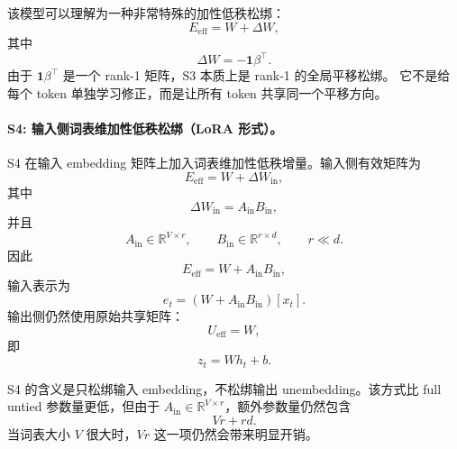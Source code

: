 该模型可以理解为一种非常特殊的加性低秩松绑：
\begin{equation}
    E_{\mathrm{eff}} = W + \Delta W,
\end{equation}
其中
\begin{equation}
    \Delta W = -\mathbf{1}\beta^\top.
\end{equation}
由于 $\mathbf{1}\beta^\top$ 是一个 rank-1 矩阵，S3 本质上是 rank-1 的全局平移松绑。
它不是给每个 token 单独学习修正，而是让所有 token 共享同一个平移方向。

\paragraph{S4: 输入侧词表维加性低秩松绑（LoRA 形式）。}
S4 在输入 embedding 矩阵上加入词表维加性低秩增量。输入侧有效矩阵为
\begin{equation}
    E_{\mathrm{eff}} = W + \Delta W_{\mathrm{in}},
\end{equation}
其中
\begin{equation}
    \Delta W_{\mathrm{in}} = A_{\mathrm{in}}B_{\mathrm{in}},
\end{equation}
并且
\begin{equation}
    A_{\mathrm{in}} \in \mathbb{R}^{V \times r}, \qquad
    B_{\mathrm{in}} \in \mathbb{R}^{r \times d}, \qquad
    r \ll d.
\end{equation}
因此
\begin{equation}
    E_{\mathrm{eff}} = W + A_{\mathrm{in}}B_{\mathrm{in}},
\end{equation}
输入表示为
\begin{equation}
    e_t = \left(W + A_{\mathrm{in}}B_{\mathrm{in}}\right)[x_t].
\end{equation}
输出侧仍然使用原始共享矩阵：
\begin{equation}
    U_{\mathrm{eff}} = W,
\end{equation}
即
\begin{equation}
    z_t = W h_t + b.
\end{equation}

S4 的含义是只松绑输入 embedding，不松绑输出 unembedding。该方式比 full untied
参数量更低，但由于 $A_{\mathrm{in}} \in \mathbb{R}^{V \times r}$，额外参数量仍然包含
\begin{equation}
    Vr + rd.
\end{equation}
当词表大小 $V$ 很大时，$Vr$ 这一项仍然会带来明显开销。

